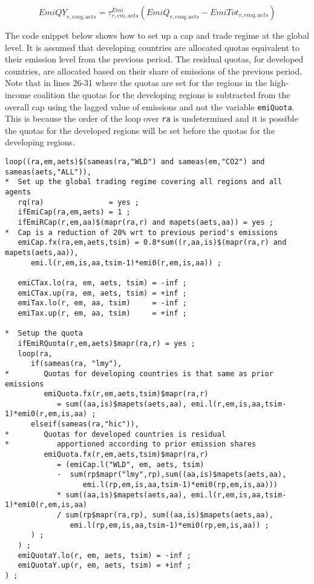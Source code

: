 \documentclass[11pt,letterpaper]{report}
\begin{document}
\begin{equation}
\label{eq:emiquotaY}
\mathit{EmiQY}_{r,\mathit{emq},\mathit{aets}} =
   \tau^{\mathit{Emi}}_{r,\mathit{em},\mathit{aets}} \left(
      \mathit{EmiQ}_{r,\mathit{emq},\mathit{aets}} - \mathit{EmiTot}_{r,\mathit{emq},\mathit{aets}}
   \right)
\end{equation}

The code snippet below shows
how to set up a cap and trade regime at the global level. It is assumed that
developing countries are allocated quotas equivalent to their emission level
from the previous period. The residual quotas, for developed countries, are
allocated based on their share of emissions of the previous period. Note that in
lines 26-31 where the quotas are set for the regions in the high-income
coalition the quotas for the developing regions is subtracted from the overall
cap using the lagged value of emissions and not the variable \texttt{emiQuota}.
This is because the order of the loop over \texttt{ra} is undetermined and it is
possible the quotas for the developed regions will be set before the quotas
for the developing regions.

\begin{lstlisting}[language=GAMS, caption={Example of a cap and trade regime}]
loop((ra,em,aets)$(sameas(ra,"WLD") and sameas(em,"CO2") and sameas(aets,"ALL")),
*  Set up the global trading regime covering all regions and all agents
   rq(ra)               = yes ;
   ifEmiCap(ra,em,aets) = 1 ;
   ifEmiRCap(r,em,aa)$(mapr(ra,r) and mapets(aets,aa)) = yes ;
*  Cap is a reduction of 20% wrt to previous period's emissions
   emiCap.fx(ra,em,aets,tsim) = 0.8*sum((r,aa,is)$(mapr(ra,r) and mapets(aets,aa)),
      emi.l(r,em,is,aa,tsim-1)*emi0(r,em,is,aa)) ;

   emiCTax.lo(ra, em, aets, tsim) = -inf ;
   emiCTax.up(ra, em, aets, tsim) = +inf ;
   emiTax.lo(r, em, aa, tsim)     = -inf ;
   emiTax.up(r, em, aa, tsim)     = +inf ;

*  Setup the quota
   ifEmiRQuota(r,em,aets)$mapr(ra,r) = yes ;
   loop(ra,
      if(sameas(ra, "lmy"),
*        Quotas for developing countries is that same as prior emissions
         emiQuota.fx(r,em,aets,tsim)$mapr(ra,r)
            = sum((aa,is)$mapets(aets,aa), emi.l(r,em,is,aa,tsim-1)*emi0(r,em,is,aa) ;
      elseif(sameas(ra,"hic")),
*        Quotas for developed countries is residual
*           apportioned according to prior emission shares
         emiQuota.fx(r,em,aets,tsim)$mapr(ra,r)
            = (emiCap.l("WLD", em, aets, tsim)
            -  sum(rp$mapr("lmy",rp),sum((aa,is)$mapets(aets,aa),
                  emi.l(rp,em,is,aa,tsim-1)*emi0(rp,em,is,aa)))
            * sum((aa,is)$mapets(aets,aa), emi.l(r,em,is,aa,tsim-1)*emi0(r,em,is,aa)
            / sum(rp$mapr(ra,rp), sum((aa,is)$mapets(aets,aa),
               emi.l(rp,em,is,aa,tsim-1)*emi0(rp,em,is,aa)) ;
      ) ;
   ) ;
   emiQuotaY.lo(r, em, aets, tsim) = -inf ;
   emiQuotaY.up(r, em, aets, tsim) = +inf ;
) ;
\end{lstlisting}
\end{document}
